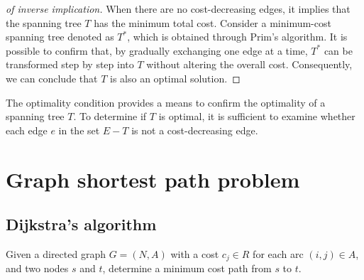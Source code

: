 \documentclass[12pt, a4paper]{report}
\begin{document}
    \begin{proof}[of inverse implication]
        When there are no cost-decreasing edges, it implies that the spanning tree $T$ has the minimum total cost.
        Consider a minimum-cost spanning tree denoted as $T^{*}$, which is obtained through Prim's algorithm.
        It is possible to confirm that, by gradually exchanging one edge at a time, $T^{*}$ can be transformed step by step into $T$ without altering the overall cost.
        Consequently, we can conclude that $T$ is also an optimal solution.
    \end{proof}
    The optimality condition provides a means to confirm the optimality of a spanning tree $T$. 
    To determine if $T$ is optimal, it is sufficient to examine whether each edge $e$ in the set $E-T$ is not a cost-decreasing edge.

    \section{Graph shortest path problem}
    \subsection{Dijkstra's algorithm}
    Given a directed graph $G=(N,A)$ with a cost $c_j \in R$ for each arc $(i,j) \in A$, and two nodes $s$ and $t$, determine a minimum cost path from $s$ to $t$. 
\end{document}
